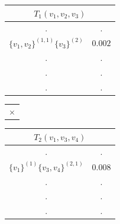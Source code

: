 \documentclass[11pt]{article}
\begin{document}
\begin{table}[!htb]
    \begin{minipage}{.3\linewidth}
      \centering
     \begin{tabular}{cc}
\multicolumn{2}{c}{$T_1(v_1,v_2,v_3)$}                           \\ \hline
\multicolumn{1}{|c}{.} & \multicolumn{1}{|c|}{.} \\ \hline
\multicolumn{1}{|l}{$\{v_1,v_2\}^{(1,1)} \{v_3\}^{(2)}$} & \multicolumn{1}{|l|}{$0.002$} \\ \hline
                             \multicolumn{1}{|c}{.} & \multicolumn{1}{|c|}{.} \\ \hline               
                   \multicolumn{1}{|c}{.} & \multicolumn{1}{|c|}{.} \\ \hline
                   \multicolumn{1}{|c}{.} & \multicolumn{1}{|c|}{.} \\ \hline        
\end{tabular}
    \end{minipage}%
    \begin{minipage}{.05\linewidth}
        \begin{tabular}{c}
     $ \times$\\
        \end{tabular}
    \end{minipage}%
     \begin{minipage}{.3\linewidth}
      \centering
     \begin{tabular}{cc}
\multicolumn{2}{c}{$T_2(v_1,v_3,v_4)$}                           \\ \hline
\multicolumn{1}{|c}{.} & \multicolumn{1}{|c|}{.} \\ \hline
\multicolumn{1}{|l}{$\{v_1\}^{(1)}\{v_3,v_4\}^{(2,1)}$} & \multicolumn{1}{|l|}{$0.008$} \\ \hline
                   \multicolumn{1}{|c}{.} & \multicolumn{1}{|c|}{.} \\ \hline               
                   \multicolumn{1}{|c}{.} & \multicolumn{1}{|c|}{.} \\ \hline
                   \multicolumn{1}{|c}{.} & \multicolumn{1}{|c|}{.} \\ \hline        
\end{tabular}
    \end{minipage}%
      \begin{minipage}{.06\linewidth}

\end{minipage}
\end{table}
\end{document}
